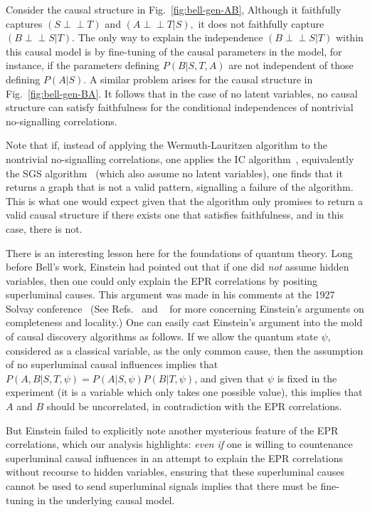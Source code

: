 \documentclass[12pt,onecolumn,nofootinbib]{revtex4-2}
\def\indep{\perp\!\!\!\!\perp}
\begin{document}
Consider the causal structure in Fig.~\ref{fig:bell-gen-AB}, Although it faithfully
captures $\left( S\indep T\right) $ and $\left( A\indep T|S\right) ,$ it does
not faithfully capture $\left( B\indep S|T\right) .$ The only way to
explain the independence $\left( B\indep S|T\right) $ within this causal
model is by fine-tuning of the causal parameters in the model, for instance,
if the parameters defining $P(B|S,T,A)$ are not independent of those
defining $P(A|S)$. A similar problem arises for the causal structure in
Fig.~\ref{fig:bell-gen-BA}. It follows that in the case of no latent variables, no
causal structure can satisfy faithfulness for the conditional independences of nontrivial
no-signalling correlations.

Note that if, instead of applying the Wermuth-Lauritzen algorithm to the nontrivial no-signalling correlations, one applies the IC algorithm~\cite{Pearl2009}, equivalently the SGS algorithm~\cite{Spirtes2001} (which also assume no latent variables), one finds that it returns a graph that is not a valid pattern, signalling a failure of the algorithm.  This is what one would expect given that the algorithm only promises to return a valid causal structure if there exists one that satisfies faithfulness, and in this case, there is not.

There is an interesting lesson here for the foundations of quantum theory.
Long before Bell's work, Einstein had pointed
out that if one did \emph{not} assume hidden variables, then one could only
explain the EPR correlations by positing superluminal causes. This
argument was made in his comments at the 1927 Solvay conference~\cite{Bacci2009} (See Refs.~\cite{Norsen2010} and ~\cite{Harrigan2010} for more concerning Einstein's
arguments on completeness and locality.) One can easily cast Einstein's
argument into the mold of causal discovery algorithms as follows. If we allow the quantum state $\psi$, considered as a classical variable, as the only common cause, then the assumption of no superluminal
causal influences implies that $P(A,B|S,T,\psi )=P(A|S,\psi )P(B|T,\psi )$, and given that $
\psi $ is fixed in the experiment (it is a variable which only takes one
possible value), this implies that $A$ and $B$ should be uncorrelated, in
contradiction with the EPR correlations.

But Einstein failed to explicitly note another mysterious feature of the EPR correlations, which our analysis highlights:
\emph{even if} one is willing to countenance superluminal causal influences in an
attempt to explain the EPR correlations without recourse to hidden variables,
ensuring that these superluminal causes cannot be used to send
superluminal signals implies that there must be fine-tuning in the
underlying causal model.
\end{document}
